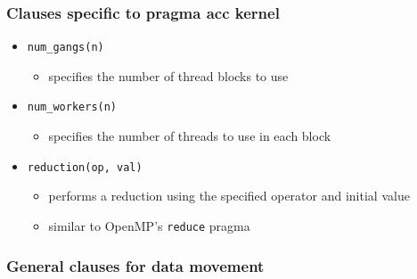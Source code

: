 \subsubsection{Clauses specific to pragma acc
kernel}\label{clauses-specific-to-pragma-acc-kernel}

\begin{itemize}
\itemsep1pt\parskip0pt
\item
  \texttt{num\_gangs(n)}

  \begin{itemize}
  \itemsep1pt\parskip0pt
  \item
    specifies the number of thread blocks to use
  \end{itemize}
\item
  \texttt{num\_workers(n)}

  \begin{itemize}
  \itemsep1pt\parskip0pt
  \item
    specifies the number of threads to use in each block
  \end{itemize}
\item
  \texttt{reduction(op, val)}

  \begin{itemize}
  \itemsep1pt\parskip0pt
  \item
    performs a reduction using the specified operator and initial value
  \item
    similar to OpenMP's \texttt{reduce} pragma
  \end{itemize}
\end{itemize}

\subsubsection{General clauses for data
movement}\label{general-clauses-for-data-movement}

